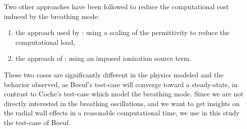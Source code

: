 Two other approaches have been followed to reduce the computational cost induced by the breathing mode\string:
\begin{enumerate}
  \item the approach used by \citet{coche2014}\string: using a scaling of the permittivity to reduce the computational load,
  \item the approach of \citet{boeuf2018}\string: using an imposed ionization source term.
\end{enumerate} 
These two cases are significantly different in the physics modeled and the behavior observed, as Boeuf's test-case will converge toward a steady-state, in contrast to Coche's test-case which model the breathing mode.
Since we are not directly interested in the breathing oscillations, and we want to get insights on the radial wall effects in a reasonable computational time, we use in this study the test-case of Boeuf.
% 
% 
% 
% 
% 
% 
% 
